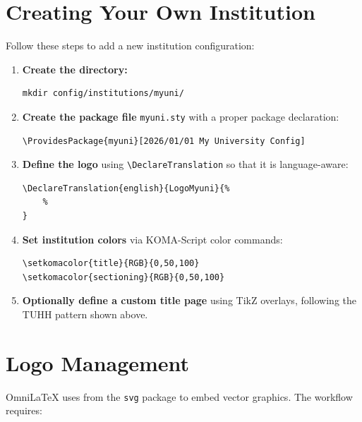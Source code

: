 \section{Creating Your Own Institution}

Follow these steps to add a new institution configuration:

\begin{enumerate}
    \item \textbf{Create the directory:}
\begin{verbatim}
mkdir config/institutions/myuni/
\end{verbatim}

    \item \textbf{Create the package file} \texttt{myuni.sty} with a proper
          package declaration:
\begin{verbatim}
\ProvidesPackage{myuni}[2026/01/01 My University Config]
\end{verbatim}

    \item \textbf{Define the logo} using \verb|\DeclareTranslation| so that
          it is language-aware:
\begin{verbatim}
\DeclareTranslation{english}{LogoMyuni}{%
    %
}
\end{verbatim}

    \item \textbf{Set institution colors} via KOMA-Script color commands:
\begin{verbatim}
\setkomacolor{title}{RGB}{0,50,100}
\setkomacolor{sectioning}{RGB}{0,50,100}
\end{verbatim}

    \item \textbf{Optionally define a custom title page} using TikZ overlays,
          following the TUHH pattern shown above.
\end{enumerate}

\section{Logo Management}

OmniLaTeX uses \verb|| from the \texttt{svg} package to embed
vector graphics. The workflow requires:

